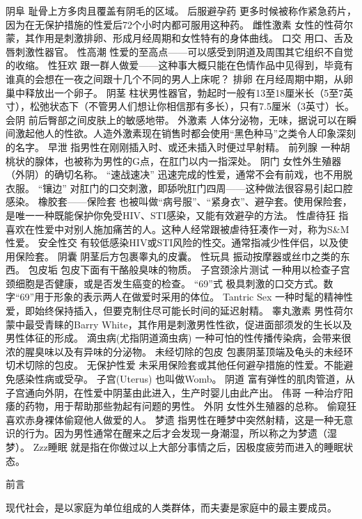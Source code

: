 \documentclass[12pt,UTF8]{ctexbook}
\begin{document}
阴阜
耻骨上方多肉且覆盖有阴毛的区域。
后服避孕药
更多时候被称作紧急药片，因为在无保护措施的性爱后72个小时内都可服用这种药。
雌性激素
女性的性荷尔蒙，其作用是刺激排卵、形成月经周期和女性特有的身体曲线。
口交
用口、舌及唇刺激性器官。
性高潮
性爱的至高点——可以感受到阴道及周围其它组织不自觉的收缩。
性狂欢
跟一群人做爱——这种事大概只能在色情作品中见得到，毕竟有谁真的会想在一夜之间跟十几个不同的男人上床呢？
排卵
在月经周期中期，从卵巢中释放出一个卵子。
阴茎
柱状男性器官，勃起时一般有13至18厘米长（5至7英寸），松弛状态下（不管男人们想让你相信那有多长），只有7.5厘米（3英寸）长。
会阴
前后臀部之间皮肤上的敏感地带。
外激素
人体分泌物，无味，据说可以在瞬间激起他人的性欲。人造外激素现在销售时都会使用“黑色种马”之类令人印象深刻的名字。
早泄
指男性在刚刚插入时、或还未插入时便过早射精。
前列腺
一种胡桃状的腺体，也被称为男性的G点，在肛门以内一指深处。
阴门
女性外生殖器（外阴）的确切名称。
“速战速决”
迅速完成的性爱，通常不会有前戏，也不用脱衣服。
“镶边”
对肛门的口交刺激，即舔吮肛门四周——这种做法很容易引起口腔感染。
橡胶套——保险套
也被叫做“病号服”、“紧身衣”、避孕套。使用保险套，是唯一一种既能保护你免受HIV、STI感染，又能有效避孕的方法。
性虐待狂
指喜欢在性爱中对别人施加痛苦的人。这种人经常跟被虐待狂凑作一对，称为S\&M性爱。
安全性交
有较低感染HIV或STI风险的性交。通常指减少性伴侣，以及使用保险套。
阴囊
阴茎后方包裹睾丸的皮囊。
性玩具
振动按摩器或丝巾之类的东西。
包皮垢
包皮下面有干酪般臭味的物质。
子宫颈涂片测试
一种用以检查子宫颈细胞是否健康，或是否发生癌变的检查。
“69”式
极具刺激的口交方式。数字“69”用于形象的表示两人在做爱时采用的体位。
Tantric Sex
一种时髦的精神性爱，即始终保持插入，但要克制住尽可能长时间的延迟射精。
睾丸激素
男性荷尔蒙中最受青睐的Barry White，其作用是刺激男性性欲，促进面部须发的生长以及男性体征的形成。
滴虫病(尤指阴道滴虫病)
一种可怕的性传播传染病，会带来很浓的腥臭味以及有异味的分泌物。
未经切除的包皮
包裹阴茎顶端及龟头的未经环切术切除的包皮。
无保护性爱
未采用保险套或其他任何避孕措施的性爱。不能避免感染性病或受孕。
子宫(Uterus)
也叫做Womb。
阴道
富有弹性的肌肉管道，从子宫通向外阴，在性爱中阴茎由此进入，生产时婴儿由此产出。
伟哥
一种治疗阳痿的药物，用于帮助那些勃起有问题的男性。
外阴
女性外生殖器的总称。
偷窥狂
喜欢赤身裸体偷窥他人做爱的人。
梦遗
指男性在睡梦中突然射精，这是一种无意识的行为。因为男性通常在醒来之后才会发现一身潮湿，所以称之为梦遗（湿梦）。
Zzz睡眠
就是指在你做过以上大部分事情之后，因极度疲劳而进入的睡眠状态。





前言

现代社会，是以家庭为单位组成的人类群体，而夫妻是家庭中的最主要成员。
\end{document}
